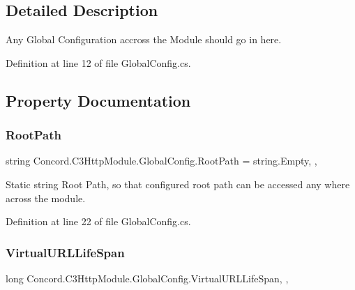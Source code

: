 \subsection{Detailed Description}
Any Global Configuration accross the Module should go in here. 



Definition at line 12 of file Global\+Config.\+cs.



\subsection{Property Documentation}
\mbox{\label{class_concord_1_1_c3_http_module_1_1_global_config_a21a3589b22cff498ecd2828fdecf1213}} 
\subsubsection{\texorpdfstring{RootPath}{RootPath}}
{\footnotesize\ttfamily string Concord.\+C3\+Http\+Module.\+Global\+Config.\+Root\+Path = string.\+Empty\hspace{0.3cm}{\ttfamily [static]}, {\ttfamily [get]}, {\ttfamily [set]}}



Static string Root Path, so that configured root path can be accessed any where across the module. 



Definition at line 22 of file Global\+Config.\+cs.

\mbox{\label{class_concord_1_1_c3_http_module_1_1_global_config_a9ff6ba552706a86c5ef0ecfa108a9d84}} 
\subsubsection{\texorpdfstring{VirtualURLLifeSpan}{VirtualURLLifeSpan}}
{\footnotesize\ttfamily long Concord.\+C3\+Http\+Module.\+Global\+Config.\+Virtual\+U\+R\+L\+Life\+Span\hspace{0.3cm}{\ttfamily [static]}, {\ttfamily [get]}, {\ttfamily [set]}}



